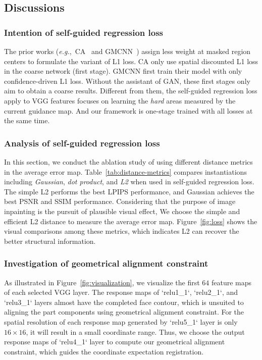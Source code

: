 \documentclass[journal]{IEEEtran}
\newcommand{\eg}{\emph{e.g.}}
\begin{document}
\subsection{Discussions}
\subsubsection{Intention of self-guided regression loss}
The prior works (\eg,~CA~\cite{contextual-attention} and GMCNN~\cite{GMCNN}) assign less weight at masked region centers to formulate the variant of L1 loss. CA only use spatial discounted L1 loss in the coarse network (first stage). GMCNN first train their model with only confidence-driven L1 loss. Without the assistant of GAN, these first stages only aim to obtain a coarse results. Different from them, the self-guided regression loss apply to VGG features focuses on learning the \textit{hard} areas measured by the current guidance map. And our framework is one-stage trained with all losses at the same time.

\subsubsection{Analysis of self-guided regression loss}
In this section, we conduct the ablation study of using different distance metrics in the average error map. Table~\ref{tab:distance-metrics} compares instantiations including \textit{Gaussian}, \textit{dot product}, and \textit{L2} when used in self-guided regression loss. The simple L2 performs the best LPIPS performance, and Gaussian achieves the best PSNR and SSIM performance. Considering that the purpose of image inpainting is the pursuit of plausible visual effect, We choose the simple and efficient L2 distance to measure the average error map. Figure~\ref{fig:loss} shows the visual comparisons among these metrics, which indicates L2 can recover the better structural information.


\subsubsection{Investigation of geometrical alignment constraint}
As illustrated in Figure~\ref{fig:visualization}, we visualize the first $64$ feature maps of each selected VGG layer. The response maps of `relu1\_1`, `relu2\_1`, and `relu3\_1` layers almost have the completed face contour, which is unsuited to aligning the part components using geometrical alignment constraint. For the spatial resolution of each response map generated by `relu5\_1` layer is only $16 \times 16$, it will result in a small coordinate range. Thus, we choose the output response maps of `relu4\_1` layer to compute our geometrical alignment constraint, which guides the coordinate expectation registration.
\end{document}
